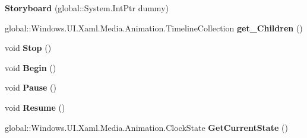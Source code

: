 \begin{DoxyCompactItemize}
\item 
\mbox{\label{class_windows_1_1_u_i_1_1_xaml_1_1_media_1_1_animation_1_1_storyboard_ac3faa5cda538d41cc59013f3f81f1655}} 
{\bfseries Storyboard} (global\+::\+System.\+Int\+Ptr dummy)
\item 
\mbox{\label{class_windows_1_1_u_i_1_1_xaml_1_1_media_1_1_animation_1_1_storyboard_ad0f6b9c0bedc7d1b44d1977fc371c08c}} 
global\+::\+Windows.\+U\+I.\+Xaml.\+Media.\+Animation.\+Timeline\+Collection {\bfseries get\+\_\+\+Children} ()
\item 
\mbox{\label{class_windows_1_1_u_i_1_1_xaml_1_1_media_1_1_animation_1_1_storyboard_aa40e1168c9cf5d0a608c601e86efc278}} 
void {\bfseries Stop} ()
\item 
\mbox{\label{class_windows_1_1_u_i_1_1_xaml_1_1_media_1_1_animation_1_1_storyboard_aebd7156a0b7f433f785472aa73411daa}} 
void {\bfseries Begin} ()
\item 
\mbox{\label{class_windows_1_1_u_i_1_1_xaml_1_1_media_1_1_animation_1_1_storyboard_ae4c08b52d0438fb4e059923d544e8af6}} 
void {\bfseries Pause} ()
\item 
\mbox{\label{class_windows_1_1_u_i_1_1_xaml_1_1_media_1_1_animation_1_1_storyboard_ad18fec80569ba300486c385391f2fc96}} 
void {\bfseries Resume} ()
\item 
\mbox{\label{class_windows_1_1_u_i_1_1_xaml_1_1_media_1_1_animation_1_1_storyboard_a633685fb262335d00b50b36515373160}} 
global\+::\+Windows.\+U\+I.\+Xaml.\+Media.\+Animation.\+Clock\+State {\bfseries Get\+Current\+State} ()
\item 
\mbox{\label{class_windows_1_1_u_i_1_1_xaml_1_1_media_1_1_animation_1_1_storyboard_ac88c93db5e691dd229f0f19a90e80af6}} 

\end{DoxyCompactItemize}
